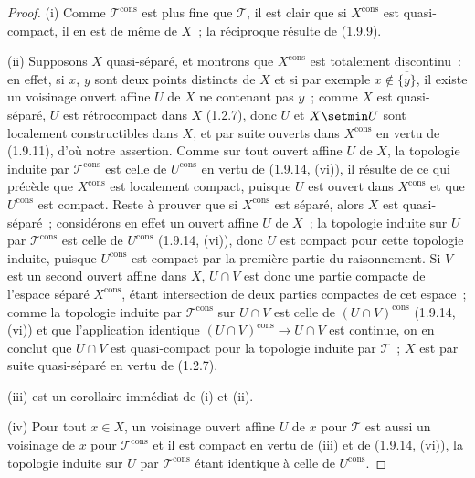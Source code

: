 \begin{proof}
(i) Comme $\mathscr T^{\mathrm{cons}}$ est plus fine que $\mathscr T$, il est
clair que si $X^{\mathrm{cons}}$ est quasi-compact, il en est de même de $X$~;
la réciproque résulte de (1.9.9).

(ii) Supposons $X$ quasi-séparé, et montrons que $X^{\mathrm{cons}}$ est
totalement discontinu~: en effet, si $x$, $y$ sont deux points distincts de
$X$ et si par exemple $x\notin\overline{\{y\}}$, il existe un
voisinage ouvert affine $U$ de $X$ ne contenant pas $y$~; comme $X$ est
quasi-séparé, $U$ est rétrocompact dans $X$ (1.2.7), donc $U$ et $X\setmin U$ sont
localement constructibles dans $X$, et par suite ouverts dans
$X^{\mathrm{cons}}$ en vertu de (1.9.11), d'où notre assertion. Comme sur tout
ouvert affine $U$ de $X$, la topologie induite par $\mathscr T^{\mathrm{cons}}$
est celle de $U^{\mathrm{cons}}$ en vertu de (1.9.14, (vi)), il résulte de ce
qui précède que $X^{\mathrm{cons}}$ est localement compact, puisque $U$ est
ouvert dans $X^{\mathrm{cons}}$ et que $U^{\mathrm{cons}}$ est compact. Reste à
prouver que si $X^{\mathrm{cons}}$ est séparé, alors $X$ est quasi-séparé~;
considérons en effet un ouvert affine $U$ de $X$~; la topologie induite sur
$U$ par $\mathscr T^{\mathrm{cons}}$ est celle de $U^{\mathrm{cons}}$
(1.9.14, (vi)), donc $U$ est compact pour cette topologie induite, puisque
$U^{\mathrm{cons}}$ est compact par la première partie du raisonnement. Si
$V$ est un second ouvert affine dans $X$, $U\cap V$ est donc une partie
compacte de l'espace séparé $X^{\mathrm{cons}}$, étant intersection de deux
parties compactes de cet espace~; comme la topologie induite par
$\mathscr T^{\mathrm{cons}}$ sur $U\cap V$ est celle de
$(U\cap V)^{\mathrm{cons}}$ (1.9.14, (vi)) et que l'application identique
$(U\cap V)^{\mathrm{cons}}\to U\cap V$ est continue, on en conclut que
$U\cap V$ est quasi-compact pour la topologie induite par $\mathscr T$~; $X$
est par suite quasi-séparé en vertu de (1.2.7).

(iii) est un corollaire immédiat de (i) et (ii).

(iv) Pour tout $x\in X$, un voisinage ouvert affine $U$ de $x$ pour
$\mathscr T$ est aussi un voisinage de $x$ pour $\mathscr T^{\mathrm{cons}}$
et il est compact en vertu de (iii) et de (1.9.14, (vi)), la topologie induite
sur $U$ par $\mathscr T^{\mathrm{cons}}$ étant identique à celle de
$U^{\mathrm{cons}}$.


\end{proof}
